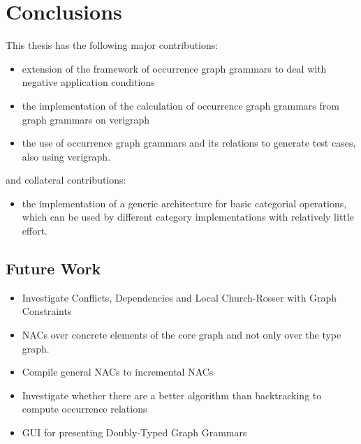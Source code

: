 \chapter{Conclusions}\label{ch:conclusions}

This thesis has the following major contributions:

\begin{itemize}
  \item extension of the framework of occurrence graph grammars to deal with negative application conditions
  \item the implementation of the calculation of occurrence graph grammars from graph grammars on verigraph
  \item the use of occurrence graph grammars and its relations to generate test cases, also using verigraph.
\end{itemize}

and collateral contributions:

\begin{itemize}
\item the implementation of a generic architecture for basic categorial operations, which can be used by different category implementations with relatively little effort.
\end{itemize}

\section{Future Work}

\begin{itemize}
  \item Investigate Conflicts, Dependencies and Local Church-Rosser with Graph Constraints
  \item NACs over concrete elements of the core graph and not only over the type graph. 
  \item Compile general NACs to incremental NACs
  \item Investigate whether there are a better algorithm than backtracking to compute occurrence relations
  \item GUI for presenting Doubly-Typed Graph Grammars
\end{itemize}
